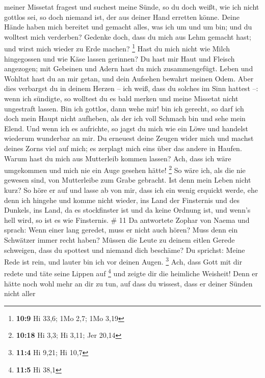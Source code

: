 meiner Missetat fragest und suchest meine Sünde,  so du
doch weißt, wie ich nicht gottlos sei, so doch niemand ist, der aus
deiner Hand erretten könne.  Deine Hände haben mich
bereitet und gemacht alles, was ich um und um bin; und du wolltest mich
verderben?  Gedenke doch, dass du mich aus Lehm gemacht
hast; und wirst mich wieder zu Erde machen? \footnote{\textbf{10:9} Hi
  33,6; 1Mo 2,7; 1Mo 3,19}  Hast du mich nicht wie Milch
hingegossen und wie Käse lassen gerinnen?  Du hast mir
Haut und Fleisch angezogen; mit Gebeinen und Adern hast du mich
zusammengefügt.  Leben und Wohltat hast du an mir getan,
und dein Aufsehen bewahrt meinen Odem.  Aber dies
verbargst du in deinem Herzen -- ich weiß, dass du solches im Sinn
hattest --:  wenn ich sündigte, so wolltest du es bald
merken und meine Missetat nicht ungestraft lassen.  Bin
ich gottlos, dann wehe mir! bin ich gerecht, so darf ich doch mein Haupt
nicht aufheben, als der ich voll Schmach bin und sehe mein Elend.
 Und wenn ich es aufrichte, so jagst du mich wie ein Löwe
und handelst wiederum wunderbar an mir.  Du erneuest
deine Zeugen wider mich und machst deines Zorns viel auf mich; es
zerplagt mich eins über das andere in Haufen.  Warum hast
du mich aus Mutterleib kommen lassen? Ach, dass ich wäre umgekommen und
mich nie ein Auge gesehen hätte! \footnote{\textbf{10:18} Hi 3,3; Hi
  3,11; Jer 20,14}  So wäre ich, als die nie gewesen
sind, von Mutterleibe zum Grabe gebracht.  Ist denn mein
Leben nicht kurz? So höre er auf und lasse ab von mir, dass ich ein
wenig erquickt werde,  ehe denn ich hingehe und komme
nicht wieder, ins Land der Finsternis und des Dunkels, 
ins Land, da es stockfinster ist und da keine Ordnung ist, und wenn's
hell wird, so ist es wie Finsternis. \# 11  Da antwortete
Zophar von Naema und sprach:  Wenn einer lang geredet,
muss er nicht auch hören? Muss denn ein Schwätzer immer recht haben?
 Müssen die Leute zu deinem eitlen Gerede schweigen, dass
du spottest und niemand dich beschäme?  Du sprichst: Meine
Rede ist rein, und lauter bin ich vor deinen Augen. \footnote{\textbf{11:4}
  Hi 9,21; Hi 10,7}  Ach, dass Gott mit dir redete und
täte seine Lippen auf \footnote{\textbf{11:5} Hi 38,1} 
und zeigte dir die heimliche Weisheit! Denn er hätte noch wohl mehr an
dir zu tun, auf dass du wissest, dass er deiner Sünden nicht aller
